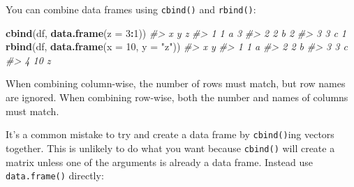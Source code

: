 \documentclass[]{book}
\newenvironment{Shaded}{\begin{snugshade}}{\end{snugshade}}
\newcommand{\KeywordTok}[1]{\textcolor[rgb]{0.13,0.29,0.53}{\textbf{#1}}}
\newcommand{\DataTypeTok}[1]{\textcolor[rgb]{0.13,0.29,0.53}{#1}}
\newcommand{\DecValTok}[1]{\textcolor[rgb]{0.00,0.00,0.81}{#1}}
\newcommand{\StringTok}[1]{\textcolor[rgb]{0.31,0.60,0.02}{#1}}
\newcommand{\CommentTok}[1]{\textcolor[rgb]{0.56,0.35,0.01}{\textit{#1}}}
\newcommand{\OperatorTok}[1]{\textcolor[rgb]{0.81,0.36,0.00}{\textbf{#1}}}
\newcommand{\NormalTok}[1]{#1}
\theoremstyle{definition}
\theoremstyle{definition}
\theoremstyle{definition}
\theoremstyle{remark}
\begin{document}
You can combine data frames using \texttt{cbind()} and \texttt{rbind()}:

\begin{Shaded}
\begin{Highlighting}[]
\KeywordTok{cbind}\NormalTok{(df, }\KeywordTok{data.frame}\NormalTok{(}\DataTypeTok{z =} \DecValTok{3}\OperatorTok{:}\DecValTok{1}\NormalTok{))}
\CommentTok{#>   x y z}
\CommentTok{#> 1 1 a 3}
\CommentTok{#> 2 2 b 2}
\CommentTok{#> 3 3 c 1}
\KeywordTok{rbind}\NormalTok{(df, }\KeywordTok{data.frame}\NormalTok{(}\DataTypeTok{x =} \DecValTok{10}\NormalTok{, }\DataTypeTok{y =} \StringTok{"z"}\NormalTok{))}
\CommentTok{#>    x y}
\CommentTok{#> 1  1 a}
\CommentTok{#> 2  2 b}
\CommentTok{#> 3  3 c}
\CommentTok{#> 4 10 z}
\end{Highlighting}
\end{Shaded}

When combining column-wise, the number of rows must match, but row names
are ignored. When combining row-wise, both the number and names of
columns must match.

It's a common mistake to try and create a data frame by
\texttt{cbind()}ing vectors together. This is unlikely to do what you
want because \texttt{cbind()} will create a matrix unless one of the
arguments is already a data frame. Instead use \texttt{data.frame()}
directly:

\begin{Shaded}
\end{Shaded}
\end{document}
